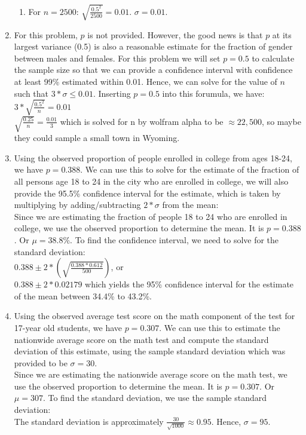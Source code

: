 \documentclass[12pt]{article}
\theoremstyle{plain}
\theoremstyle{definition}
\numberwithin{equation}{theorem}
\begin{document}
\begin{enumerate}
\begin{enumerate}
	\item For $n = 2500$: $\sqrt{\frac{0.5^{2}}{2500}} = 0.01$. $\sigma = 0.01$.
	\end{enumerate}
\item For this problem, $p$ is not provided. However, the good news is that $p$ at its largest variance (0.5) is also a reasonable estimate for the fraction of gender between males and females. For this problem we will set $p=0.5$ to calculate the sample size so that we can provide a confidence interval with confidence at least 99\% estimated within 0.01. Hence, we can solve for the value of $n$ such that $3*\sigma \leq 0.01$. Inserting $p=0.5$ into this forumula, we have:\\
\smallskip
$3*\sqrt{\frac{0.5^{2}}{n}} = 0.01$\\
\smallskip
$\sqrt{\frac{0.25}{n}} = \frac{0.01}{3}$ which is solved for n by wolfram alpha to be $\approx 22,500$, so maybe they could sample a small town in Wyoming.
\addtocounter{enumi}{1}
\item Using the observed proportion of people enrolled in college from ages 18-24, we have $p=0.388$. We can use this to solve for the estimate of the fraction of all persons age 18 to 24 in the city who are enrolled in college, we will also provide the 95.5\% confidence interval for the estimate, which is taken by multiplying by adding/subtracting $2*\sigma$ from the mean:\\
\smallskip
Since we are estimating the fraction of people 18 to 24 who are enrolled in college, we use the observed proportion to determine the mean. It is $p=0.388$. Or $\mu = 38.8\%$. To find the confidence interval, we need to solve for the standard deviation:\\
\smallskip
$0.388 \pm 2*(\sqrt{\frac{0.388*0.612}{500}})$, or\\
\smallskip
$0.388 \pm 2*0.02179$ which yields the 95\% confidence interval for the estimate of the mean between 34.4\% to 43.2\%.
\addtocounter{enumi}{1}
\item Using the observed average test score on the math component of the test for 17-year old students, we have $p=0.307$. We can use this to estimate the nationwide average score on the math test and compute the standard deviation of this estimate, using the sample standard deviation which was provided to be $\sigma = 30$.\\
\smallskip
Since we are estimating the nationwide average score on the math test, we use the observed proportion to determine the mean. It is $p=0.307$. Or $\mu = 307$. To find the standard deviation, we use the sample standard deviation:\\
\smallskip
The standard deviation is approximately $\frac{30}{\sqrt{1000}} \approx 0.95$. Hence, $\sigma=95$.
\end{enumerate}
\bigskip
\end{document}
